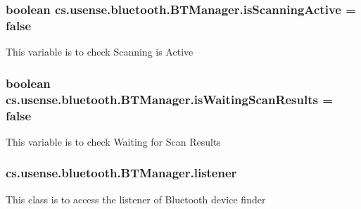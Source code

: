 \subsubsection[{is\+Scanning\+Active}]{\setlength{\rightskip}{0pt plus 5cm}boolean cs.\+usense.\+bluetooth.\+B\+T\+Manager.\+is\+Scanning\+Active = false}\label{classcs_1_1usense_1_1bluetooth_1_1_b_t_manager_ab3a60155e936f776929704c2b44d45cc}
This variable is to check Scanning is Active \hypertarget{classcs_1_1usense_1_1bluetooth_1_1_b_t_manager_acc88a4bb258b6fffee54f75b0f0cd0c5}{}
\subsubsection[{is\+Waiting\+Scan\+Results}]{\setlength{\rightskip}{0pt plus 5cm}boolean cs.\+usense.\+bluetooth.\+B\+T\+Manager.\+is\+Waiting\+Scan\+Results = false}\label{classcs_1_1usense_1_1bluetooth_1_1_b_t_manager_acc88a4bb258b6fffee54f75b0f0cd0c5}
This variable is to check Waiting for Scan Results \hypertarget{classcs_1_1usense_1_1bluetooth_1_1_b_t_manager_a7210126f7a9be3ab7bc154a0526c18ad}{}
\subsubsection[{listener}]{ cs.\+usense.\+bluetooth.\+B\+T\+Manager.\+listener\hspace{0.3cm}{\ttfamily [private]}}\label{classcs_1_1usense_1_1bluetooth_1_1_b_t_manager_a7210126f7a9be3ab7bc154a0526c18ad}
This class is to access the listener of Bluetooth device finder \hypertarget{classcs_1_1usense_1_1bluetooth_1_1_b_t_manager_a49b258b5af884eb047ec2360f4ca3c0b}{}
